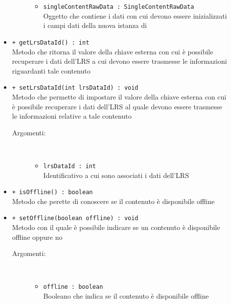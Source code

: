 \documentclass[../Tesi.tex]{subfiles}
\begin{document}
\begin{description}
\begin{itemize}
\begin{description}
\begin{itemize}
						\item \texttt{singleContentRawData : SingleContentRawData}\\
						Oggetto che contiene i dati con cui devono essere inizializzati i campi dati della nuova istanza di 
					\end{itemize}
				\end{description}

				\item \texttt{+ getLrsDataId() : int}\\
				Metodo che ritorna il valore della chiave esterna con cui è possibile recuperare i dati dell'LRS a cui devono essere trasmesse le informazioni riguardanti tale contenuto

				\item \texttt{+ setLrsDataId(int lrsDataId) : void}\\
				Metodo che permette di impostare il valore della chiave esterna con cui è possibile recuperare i dati dell'LRS al quale devono essere trasmesse le informazioni relative a tale contenuto
				\begin{description}
					\item[Argomenti:] \
					\begin{itemize}
						\item \texttt{lrsDataId : int}\\
						Identificativo a cui sono associati i dati dell'LRS
					\end{itemize}
				\end{description}

				\item \texttt{+ isOffline() : boolean}\\
				Metodo che perette di conoscere se il contenuto è disponibile offline

				\item \texttt{+ setOffline(boolean offline) : void}\\
				Metodo con il quale è possibile indicare se un contenuto è disponibile offline oppure no
				\begin{description}
					\item[Argomenti:] \
					\begin{itemize}
						\item \texttt{offline : boolean}\\
						Booleano che indica se il contenuto è disponibile offline
					\end{itemize}
				\end{description}


\end{itemize}
\end{description}
\end{document}
